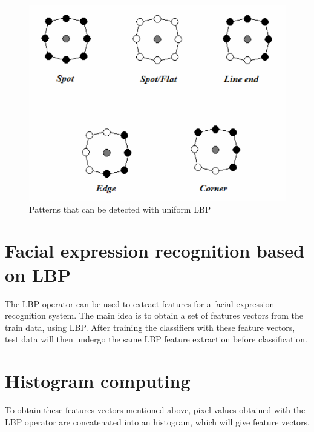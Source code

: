 \begin{figure}[!h]
\begin{center}
\noindent \includegraphics[scale=0.6]{figures/lbp_structural_features} 
\newline
\caption{Patterns that can be detected with uniform LBP}
\label{lbp_structural_features}
\end{center} 
\end{figure}

\section{Facial expression recognition based on LBP}

\vspace{\baselineskip}
\noindent The LBP operator can be used to extract features for a facial expression recognition system. The main idea is to obtain a set of features vectors from the train data, using LBP. After training the classifiers with these feature vectors, test data will then undergo the same LBP feature extraction before classification. 
\newline

\section{Histogram computing}

\vspace{\baselineskip}
\noindent To obtain these features vectors mentioned above, pixel values obtained with the LBP operator are concatenated into an histogram, which will give feature vectors.
\newline

